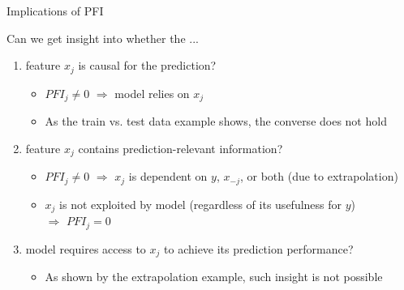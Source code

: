 \documentclass[10pt,compress,t,notes=noshow, xcolor=table]{beamer}
\begin{document}
\begin{frame}{Implications of PFI}

Can we get insight into whether the ...

\begin{enumerate}
    \item<1-> feature $x_j$ is causal for the prediction?
    \begin{itemize}
      \item $PFI_j \neq 0$ $\Rightarrow$ model relies on $x_j$
      \item As the train vs. test data example shows, the converse does not hold
    \end{itemize}
    \item<2-> feature $x_j$ contains prediction-relevant information?
    \begin{itemize}
      \item $PFI_j \neq 0$ $\Rightarrow$ $x_{j}$ is dependent on $y$, $x_{-j}$, or both (due to extrapolation) 
      \item $x_{j}$ is not exploited by model (regardless of its usefulness for $y$) \\$\Rightarrow$ $PFI_j = 0$  %
    \end{itemize}
    \item<3-> model requires access to $x_j$ to achieve its prediction performance?    
    \begin{itemize}
      \item As shown by the extrapolation example, such insight is not possible
\end{itemize}
\end{enumerate}
\end{frame}


\end{document}
